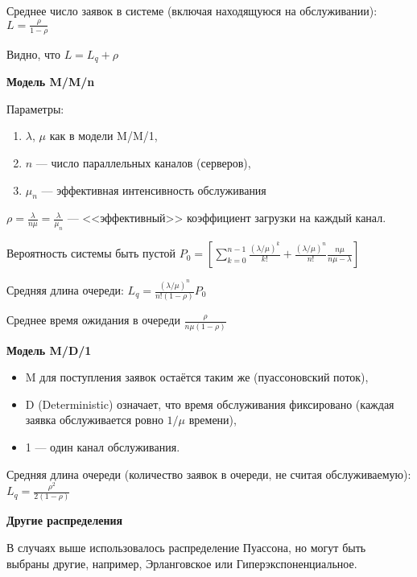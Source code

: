 Среднее число заявок в системе (включая находящуюся на обслуживании): $L = \frac{\rho}{1 - \rho}$

Видно, что $L = L_q + \rho$

\textbf{Модель M/M/n}

Параметры:
\begin{enumerate}
    \item $\lambda$, $\mu$ как в модели M/M/1,
    \item $n$ --- число параллельных каналов (серверов),
    \item $\mu_n$ --- эффективная интенсивность обслуживания
\end{enumerate}

$\rho = \frac{\lambda}{n \mu} = \frac{\lambda}{\mu_n}$ --- <<эффективный>> коэффициент загрузки на каждый канал.

Вероятность системы быть пустой $P_0 = \left[ \sum \limits ^{n-1} _{k=0} \frac{(\lambda / \mu) ^ k}{k!} + \frac{(\lambda / \mu) ^ n}{n!} \frac{n\mu}{n\mu - \lambda} \right]$

Средняя длина очереди: $L_q = \frac{(\lambda / \mu) ^ n}{n! (1-\rho)} P_0$

Среднее время ожидания в очереди $\frac{\rho}{n \mu (1 - \rho)}$

\textbf{Модель M/D/1}
\begin{itemize}
    \item M для поступления заявок остаётся таким же (пуассоновский поток),
    \item D (Deterministic) означает, что время обслуживания фиксировано (каждая заявка обслуживается ровно $1 / \mu$ времени),
    \item 1 --- один канал обслуживания.
\end{itemize}

Средняя длина очереди (количество заявок в очереди, не считая обслуживаемую): $L_q = \frac{\rho ^ 2}{2 (1 - \rho)}$

\textbf{Другие распределения}

В случаях выше использовалось распределение Пуассона, но могут быть выбраны другие, например, Эрланговское или Гиперэкспоненциальное.

